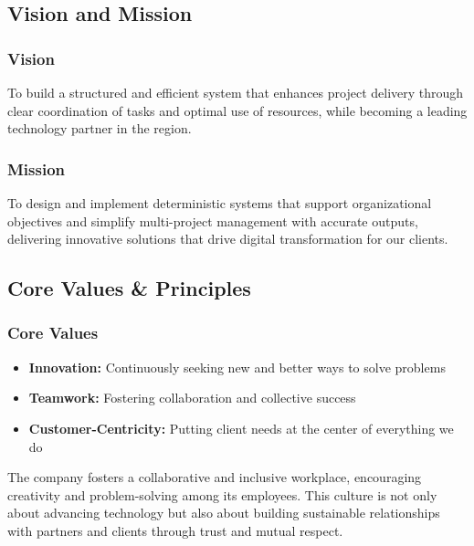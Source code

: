 \documentclass[12pt,a4paper]{article}
\begin{document}
\subsection{Vision and Mission}

\subsubsection{Vision}
To build a structured and efficient system that enhances project delivery through clear coordination of tasks and optimal use of resources, while becoming a leading technology partner in the region.

\subsubsection{Mission}
To design and implement deterministic systems that support organizational objectives and simplify multi-project management with accurate outputs, delivering innovative solutions that drive digital transformation for our clients.

\subsection{Core Values \& Principles}

\subsubsection{Core Values}
\begin{itemize}
    \item \textbf{Innovation:} Continuously seeking new and better ways to solve problems
    \item \textbf{Teamwork:} Fostering collaboration and collective success
    \item \textbf{Customer-Centricity:} Putting client needs at the center of everything we do
\end{itemize}

The company fosters a collaborative and inclusive workplace, encouraging creativity and problem-solving among its employees. This culture is not only about advancing technology but also about building sustainable relationships with partners and clients through trust and mutual respect.
\end{document}
